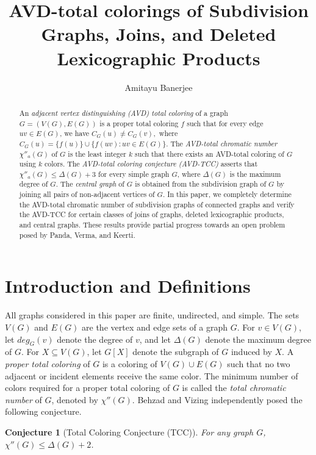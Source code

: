 \documentclass[12pt,reqno,a4paper]{amsart}
\title[AVD-Total Coloring]
{AVD-total colorings of Subdivision Graphs, Joins, and Deleted Lexicographic Products}
\author{Amitayu Banerjee}
\date{}
\theoremstyle{definition}
\theoremstyle{plain}
\newtheorem{conjecture}[defn]{Conjecture}
\begin{document}
\begin{abstract}
An {\em adjacent vertex distinguishing (AVD) total coloring} of a graph $G=(V(G),E(G))$ is a proper total coloring $f$ such that for every edge $uv\in E(G)$, we have
$
C_G(u)\neq C_G(v),
$
where $C_G(u)=\{f(u)\}\cup \{f(uv): uv\in E(G)\}$. 
The 
{\em AVD-total chromatic number}
 $\chi''_{a}(G)$ of $G$ is the least integer $k$ such that there exists an AVD-total coloring of $G$ using $k$ colors.
The {\em AVD-total coloring conjecture (AVD-TCC)} asserts that $\chi''_{a}(G)\leq \Delta(G)+3$ for every simple graph $G$, where $\Delta(G)$ is the maximum degree of $G$.
The {\em central graph} of $G$ is obtained from the subdivision graph of $G$ by joining all pairs of non-adjacent vertices of $G$. 
In this paper, we completely determine the AVD-total chromatic number of subdivision graphs of connected graphs and verify the AVD-TCC for certain classes of joins of graphs, deleted lexicographic products, and central graphs. These results provide partial progress towards an open problem posed by Panda, Verma, and Keerti. 
\end{abstract}

\maketitle
\section{Introduction and Definitions}

All graphs considered in this paper are finite, undirected, and simple.
The sets $V(G)$ and $E(G)$ are the vertex and edge sets of a graph $G$.
For $v\in V(G)$, let $deg_G(v)$ denote the degree of $v$, and let $\Delta(G)$ denote the maximum degree of $G$.
For $X\subseteq V(G)$, let $G[X]$ denote the subgraph of $G$ induced by $X$.
A \emph{proper total coloring} of  $G$ is a coloring of $V(G)\cup E(G)$  such that no two adjacent or incident elements receive the same color.
The minimum number of colors required for a proper total coloring of $G$ is called the \emph{total chromatic number} of $G$, denoted by $\chi''(G)$.
Behzad \cite{Beh1965} and Vizing \cite{Viz1968} independently posed the following conjecture.

\begin{conjecture}[Total Coloring Conjecture (TCC)]\label{Conjecture 1.1}
For any graph $G$, $\chi''(G) \leq \Delta(G) + 2$.
\end{conjecture}
\end{document}
